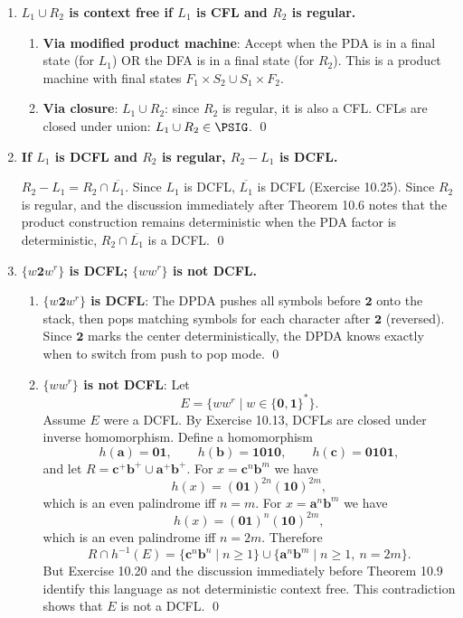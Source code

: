 \begin{enumerate}[{10.}1. ]
\item \textbf{$L_1\cup R_2$ is context free if $L_1$ is CFL and $R_2$ is regular.}

\begin{enumerate}
\item \textbf{Via modified product machine}: Accept when the PDA is in a final state (for $L_1$) OR the DFA is in a final state (for $R_2$). This is a product machine with final states $F_1 \times S_2 \cup S_1 \times F_2$.

\item \textbf{Via closure}: $L_1 \cup R_2$: since $R_2$ is regular, it is also a CFL. CFLs are closed under union: $L_1 \cup R_2 \in \PSIG$. \qed
\end{enumerate}

\item \textbf{If $L_1$ is DCFL and $R_2$ is regular, $R_2 - L_1$ is DCFL.}

$R_2 - L_1 = R_2 \cap \overline{L_1}$. Since $L_1$ is DCFL, $\overline{L_1}$ is DCFL (Exercise 10.25). Since $R_2$ is regular, and the discussion immediately after Theorem 10.6 notes that the product construction remains deterministic when the PDA factor is deterministic, $R_2 \cap \overline{L_1}$ is a DCFL. \qed

\item \textbf{$\{w\pmb{2}w^r\}$ is DCFL; $\{ww^r\}$ is not DCFL.}

\begin{enumerate}
\item \textbf{$\{w\pmb{2}w^r\}$ is DCFL}: The DPDA pushes all symbols before $\pmb{2}$ onto the stack, then pops matching symbols for each character after $\pmb{2}$ (reversed). Since $\pmb{2}$ marks the center deterministically, the DPDA knows exactly when to switch from push to pop mode. \qed

\item \textbf{$\{ww^r\}$ is not DCFL}: Let
\[
E=\{ww^r\mid w\in\{\pmb{0},\pmb{1}\}^*\}.
\]
Assume $E$ were a DCFL. By Exercise 10.13, DCFLs are closed under inverse homomorphism. Define a homomorphism
\[
h(\pmb{a})=\pmb{01},\qquad h(\pmb{b})=\pmb{1010},\qquad h(\pmb{c})=\pmb{0101},
\]
and let $R=\pmb{c}^+\pmb{b}^+\cup \pmb{a}^+\pmb{b}^+$. For $x=\pmb{c}^n\pmb{b}^m$ we have
\[
h(x)=(\pmb{01})^{2n}(\pmb{10})^{2m},
\]
which is an even palindrome iff $n=m$. For $x=\pmb{a}^n\pmb{b}^m$ we have
\[
h(x)=(\pmb{01})^n(\pmb{10})^{2m},
\]
which is an even palindrome iff $n=2m$. Therefore
\[
R\cap h^{-1}(E)=
\{\pmb{c}^n\pmb{b}^n\mid n\geq 1\}\cup
\{\pmb{a}^n\pmb{b}^m\mid n\geq 1,\ n=2m\}.
\]
But Exercise 10.20 and the discussion immediately before Theorem 10.9 identify this language as not deterministic context free. This contradiction shows that $E$ is not a DCFL. \qed
\end{enumerate}


\end{enumerate}

